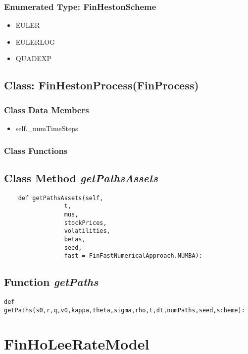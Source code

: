 \documentclass[twoside,11pt]{book}
\begin{document}
\subsubsection{Enumerated Type: FinHestonScheme}
\begin{itemize}
\item{EULER}
\item{EULERLOG}
\item{QUADEXP}
\end{itemize}

\subsection{Class: FinHestonProcess(FinProcess)}


\subsubsection{Class Data Members}
\begin{itemize}
\item{self.\_numTimeSteps}
\end{itemize}

\subsubsection{Class Functions}

\subsection{Class Method {\it getPathsAssets}}


\begin{lstlisting}
    def getPathsAssets(self, 
                 t,
                 mus,
                 stockPrices,
                 volatilities,
                 betas,
                 seed, 
                 fast = FinFastNumericalApproach.NUMBA):
\end{lstlisting}

\subsection{Function {\it getPaths}}


\begin{lstlisting}
def getPaths(s0,r,q,v0,kappa,theta,sigma,rho,t,dt,numPaths,seed,scheme):
\end{lstlisting}

\newpage
\section{FinHoLeeRateModel}
\end{document}
